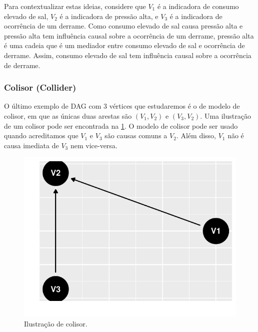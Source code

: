Para contextualizar estas ideias,
considere que $V_1$ é a indicadora de consumo elevado de sal,
$V_2$ é a indicadora de pressão alta, e
$V_3$ é a indicadora de ocorrência de um derrame.
Como consumo elevado de sal causa pressão alta e
pressão alta tem influência causal sobre a ocorrência de um derrame,
pressão alta é uma cadeia que é
um mediador entre consumo elevado de sal e
ocorrência de derrame. Assim,
consumo elevado de sal tem influência causal sobre
a ocorrência de derrame.

\subsubsection{Colisor (Collider)}

O último exemplo de DAG com $3$ vértices que 
estudaremos é o de modelo de colisor, em que
as únicas duas arestas são 
$(V_1, V_2)$ e $(V_3, V_2)$.
Uma ilustração de um colisor
pode ser encontrada 
na \cref{fig:colisor}.
O modelo de colisor pode ser usado quando
acreditamos que $V_1$ e $V_3$ são 
causas comuns a $V_2$. Além disso,
$V_1$ não é causa imediata de $V_3$ 
nem vice-versa.

\begin{knitrout}
\color{fgcolor}\begin{figure}[t]

{\centering \includegraphics[width=\maxwidth]{./figures/colisor-1} 

}

\caption[Ilustração de colisor]{Ilustração de colisor.}\label{fig:colisor}
\end{figure}

\end{knitrout}

